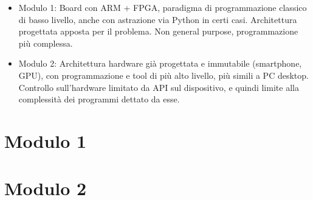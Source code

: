 \documentclass[a4paper,oneside]{book}
\begin{document}
    \begin{itemize}
        \item Modulo 1: Board con ARM + FPGA, paradigma di programmazione classico di basso livello,
            anche con astrazione via Python in certi casi. Architettura progettata apposta per 
            il problema. Non general purpose, programmazione più complessa.
        \item Modulo 2: Architettura hardware già progettata e immutabile (smartphone, GPU), con programmazione
            e tool di più alto livello, più simili a PC desktop. Controllo sull'hardware limitato 
            da API sul dispositivo, e quindi limite alla complessità dei programmi dettato da esse.
    \end{itemize}

    \chapter{Modulo 1}
    
    \chapter{Modulo 2}
    
\end{document}
